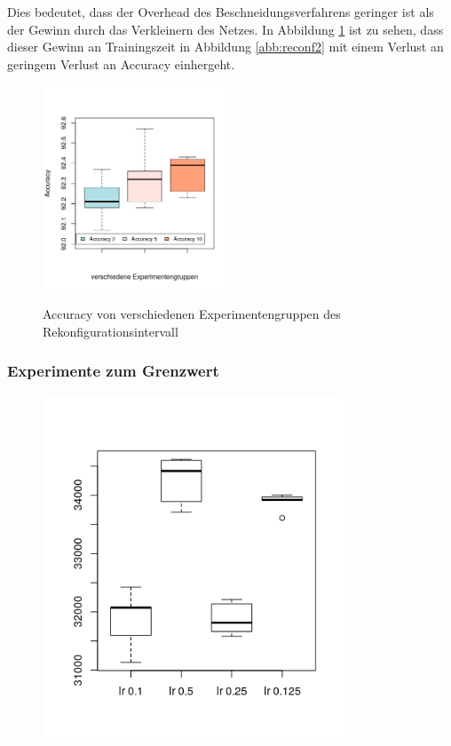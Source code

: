  Dies bedeutet, dass der Overhead des Beschneidungsverfahrens geringer ist als der Gewinn durch das Verkleinern des Netzes. In Abbildung \ref{abb:reconf3} ist zu sehen, dass dieser Gewinn an Trainingszeit in Abbildung \ref{abb:reconf2} mit einem Verlust an geringem Verlust an Accuracy einhergeht.  

 
 \begin{figure}[h]
 \centering
 \includegraphics[width=0.5\textwidth]{KapitelPartB/Images/reconf3.png}
 \label{abb:reconf3}
 \caption{Accuracy von verschiedenen Experimentengruppen des Rekonfigurationsintervall}
\end{figure}

 \subsubsection{Experimente zum Grenzwert}


\begin{figure}[h]
 \centering
 \includegraphics[width=0.8\textwidth]{KapitelPartB/Images/lr1.png}
 \label{ref:lra}
\end{figure}

